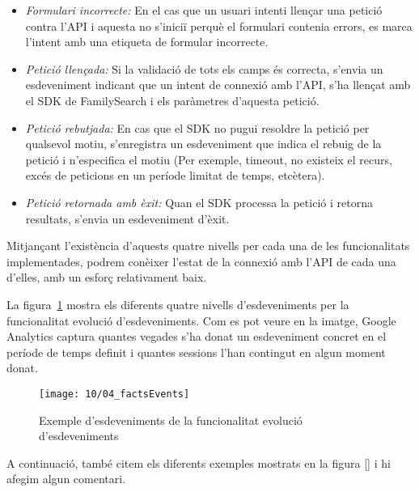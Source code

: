     \begin{itemize}
        \item \emph{Formulari incorrecte:} En el cas que un usuari intenti llençar una petició contra l'API i aquesta no s'iniciï perquè el formulari contenia errors, es marca l'intent amb una etiqueta de formular incorrecte.
        \item \emph{Petició llençada:} Si la validació de tots els camps és correcta, s'envia un esdeveniment indicant que un intent de connexió amb l'API, s'ha llençat amb el SDK de FamilySearch i els paràmetres d'aquesta petició.
        \item \emph{Petició rebutjada:} En cas que el SDK no pugui resoldre la petició per qualsevol motiu, s'enregistra un esdeveniment que indica el rebuig de la petició i n'especifica el motiu (Per exemple, timeout, no existeix el recurs, excés de peticions en un període limitat de temps, etcètera).
        \item \emph{Petició retornada amb èxit:} Quan el SDK processa la petició i retorna resultats, s'envia un esdeveniment d'èxit.
    \end{itemize}

    Mitjançant l'existència d'aquests quatre nivells per cada una de les funcionalitats implementades, podrem conèixer l'estat de la connexió amb l'API de cada una d'elles, amb un esforç relativament baix.

    La figura~\ref{img:factsEvents} mostra els diferents quatre nivells d'esdeveniments per la funcionalitat evolució d'esdeveniments. Com es pot veure en la imatge, Google Analytics captura quantes vegades s'ha donat un esdeveniment concret en el període de temps definit i quantes sessions l'han contingut en algun moment donat.

    \begin{figure}
        \texttt{[image: 10/04\_factsEvents]}
        \centering
        \caption{Exemple d'esdeveniments de la funcionalitat evolució d'esdeveniments}\label{img:factsEvents}
    \end{figure}

    A continuació, també citem els diferents exemples mostrats en la figura [] i hi afegim algun comentari.

